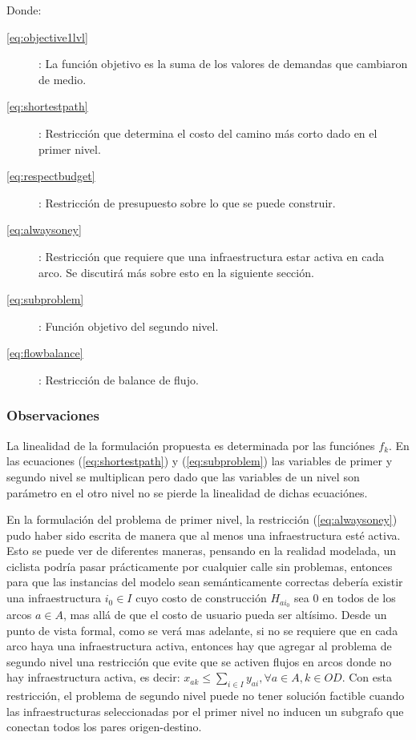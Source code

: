\documentclass{article}
\begin{document}
  Donde:

  \begin{description}
    \item[\ref{eq:objective1lvl}]: La función objetivo es la suma de los valores de demandas que cambiaron de medio.
    \item[\ref{eq:shortestpath}]: Restricción que determina el costo del camino más corto dado en el primer nivel.
    \item[\ref{eq:respectbudget}]: Restricción de presupuesto sobre lo que se puede construir.
    \item[\ref{eq:alwaysoney}]: Restricción que requiere que una infraestructura estar activa en cada arco. Se discutirá más sobre esto en la siguiente sección.
    \item[\ref{eq:subproblem}]: Función objetivo del segundo nivel.
    \item[\ref{eq:flowbalance}]: Restricción de balance de flujo.
  \end{description}

  \subsubsection*{Observaciones}

  La linealidad de la formulación propuesta es determinada por las funciónes $f_k$. En las ecuaciones (\ref{eq:shortestpath}) y (\ref{eq:subproblem}) las variables de primer y segundo nivel se multiplican pero dado que las variables de un nivel son parámetro en el otro nivel no se pierde la linealidad de dichas ecuaciónes.

  En la formulación del problema de primer nivel, la restricción (\ref{eq:alwaysoney}) pudo haber sido escrita de manera que al menos una infraestructura esté activa. Esto se puede ver de diferentes maneras, pensando en la realidad modelada, un ciclista podría pasar prácticamente por cualquier calle sin problemas, entonces para que las instancias del modelo sean semánticamente correctas debería existir una infraestructura $i_0 \in I$ cuyo costo de construcción $H_{ai_0}$ sea 0 en todos de los arcos $a \in A$, mas allá de que el costo de usuario pueda ser altísimo. Desde un punto de vista formal, como se verá mas adelante, si no se requiere que en cada arco haya una infraestructura activa, entonces hay que agregar al problema de segundo nivel una restricción que evite que se activen flujos en arcos donde no hay infraestructura activa, es decir: $x_{ak} \leq \sum_{i \in I} y_{ai}, \forall a \in A, k \in OD$. Con esta restricción, el problema de segundo nivel puede no tener solución factible cuando las infraestructuras seleccionadas por el primer nivel no inducen un subgrafo que conectan todos los pares origen-destino.
\end{document}
